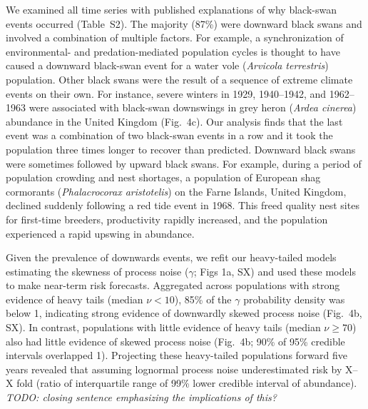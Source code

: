 We examined all time series with published explanations of why black-swan events occurred (Table~S2). The majority (87\%) were downward black swans and involved a combination of multiple factors. For example, a synchronization of environmental- and predation-mediated population cycles is thought to have caused a downward black-swan event for a water vole (\emph{Arvicola terrestris}) population\cite{saucy1994}. Other black swans were the result of a sequence of extreme climate events on their own. For instance, severe winters in 1929, 1940--1942, and 1962--1963 were associated with black-swan downswings in grey heron (\emph{Ardea cinerea}) abundance in the United Kingdom\cite{stafford1971} (Fig.~4c). Our analysis finds that the last event was a combination of two black-swan events in a row and it took the population three times longer to recover than predicted\cite{stafford1971}. Downward black swans were sometimes followed by upward black swans. For example, during a period of population crowding and nest shortages, a population of European shag cormorants (\emph{Phalacrocorax aristotelis}) on the Farne Islands, United Kingdom, declined suddenly following a red tide event in 1968\cite{potts1980}. This freed quality nest sites for first-time breeders, productivity rapidly increased, and the population experienced a rapid upswing in abundance\cite{potts1980}.

Given the prevalence of downwards events, we refit our heavy-tailed models estimating the skewness of process noise (\(\gamma\); Figs 1a, SX) and used these models to make near-term risk forecasts. Aggregated across populations with strong evidence of heavy tails (median \(\nu < 10\)), 85\% of the \(\gamma\) probability density was below 1, indicating strong evidence of downwardly skewed process noise (Fig.~4b, SX). In contrast, populations with little evidence of heavy tails (median \(\nu \geq 70\)) also had little evidence of skewed process noise (Fig.~4b; 90\% of 95\% credible intervals overlapped 1). Projecting these heavy-tailed populations forward five years revealed that assuming lognormal process noise underestimated risk by X--X fold (ratio of interquartile range of 99\% lower credible interval of abundance). \emph{TODO: closing sentence emphasizing the implications of this?}

